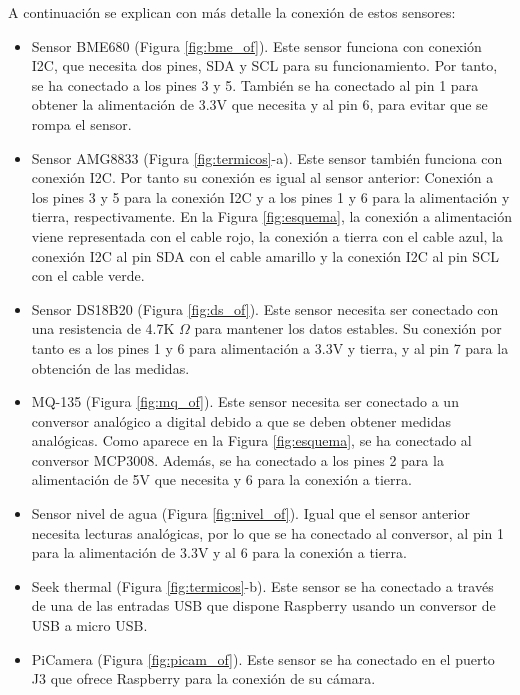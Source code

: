 A continuación se explican con más detalle la conexión de estos sensores:
\begin{itemize}
\item{Sensor BME680 (Figura \ref{fig:bme_of}).} Este sensor funciona con conexión I2C, que necesita dos pines, SDA y SCL para su funcionamiento. Por tanto, se ha conectado a los pines 3 y 5. También se ha conectado al pin 1 para obtener la alimentación de 3.3V que necesita y al pin 6, para evitar que se rompa el sensor.

\item{Sensor AMG8833 (Figura \ref{fig:termicos}-a).} Este sensor también funciona con conexión I2C. Por tanto su conexión es igual al sensor anterior: Conexión a los pines 3 y 5 para la conexión I2C y a los pines 1 y 6 para la alimentación y tierra, respectivamente. En la Figura \ref{fig:esquema}, la conexión a alimentación viene representada con el cable rojo, la conexión a tierra con el cable azul, la conexión I2C al pin SDA con el cable amarillo y la conexión I2C al pin SCL con el cable verde.

\item{Sensor DS18B20 (Figura \ref{fig:ds_of}).} Este sensor necesita ser conectado con una resistencia de 4.7K $\Omega$ para mantener los datos estables. Su conexión por tanto es a los pines 1 y 6 para alimentación a 3.3V y tierra, y al pin 7 para la obtención de las medidas.

\item{MQ-135 (Figura \ref{fig:mq_of}).} Este sensor necesita ser conectado a un conversor analógico a digital debido a que se deben obtener medidas analógicas. Como aparece en la Figura \ref{fig:esquema}, se ha conectado al conversor MCP3008. Además, se ha conectado a los pines 2 para la alimentación de 5V que necesita y 6 para la conexión a tierra.

\item{Sensor nivel de agua (Figura \ref{fig:nivel_of}).} Igual que el sensor anterior necesita lecturas analógicas, por lo que se ha conectado al conversor, al pin 1 para la alimentación de 3.3V y al 6 para la conexión a tierra.

\item{Seek thermal (Figura \ref{fig:termicos}-b).} Este sensor se ha conectado a través de una de las entradas USB que dispone Raspberry usando un conversor de USB a micro USB.

\item{PiCamera (Figura \ref{fig:picam_of}).} Este sensor se ha conectado en el puerto J3 que ofrece Raspberry para la conexión de su cámara. 
\end{itemize}

